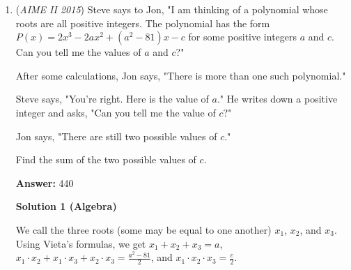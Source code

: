 \begin{enumerate}
Lets start with some simpler cases. For example, lets use a 2x2. We have $2$ horizontally and $2$ vertically, for a total of $4$. Then, our possible outcomes is just $\binom{4}{2}$, so our probability is just $\dfrac{2}{3}$. Now, lets do a 3x3. We have that there are $6$ horizontally and $6$ vertically, for a total of $12$. Our possible outcomes is just $\binom{9}{2} = 36$. Now, our probability is just $\dfrac{1}{3}$. Now, lets try to generalize. For each colum, there is $n-1$ ways, then we multiply that by $n$ for our $n$ columns. Then we multiply all that by $2$ for the rows to get $2n(n-1)$. For our denominator, we have $n^2$ squares, and we need to choose $2$ of them, so our probability is: 
 \[\dfrac{2n(n-1)}{\binom{n^2}{2}}\]. Lets simplify this. We have: 
 \[\dfrac{2n(n-1)}{\dfrac{n^2(n^2-1)}{2}} \Longrightarrow \dfrac{4}{n(n+1)}\]. So, we have this to be less than $\dfrac{1}{2015}$. So we have: 
 \[\dfrac{4}{n(n+1)} < \dfrac{1}{2015} \Longrightarrow n(n+1) > 8060\], so the smallest $n$ that satisfies this condition is $n = \boxed{090}$

 -jb2015007

 


 


	\item (\textit{AIME II 2015}) Steve says to Jon, "I am thinking of a polynomial whose roots are all positive integers. The polynomial has the form $P(x) = 2x^3-2ax^2+(a^2-81)x-c$ for some positive integers $a$ and $c$. Can you tell me the values of $a$ and $c$?"


 After some calculations, Jon says, "There is more than one such polynomial."


 Steve says, "You're right.  Here is the value of $a$." He writes down a positive integer and asks, "Can you tell me the value of $c$?"


 Jon says, "There are still two possible values of $c$."


 Find the sum of the two possible values of $c$.


 
 \textbf{Answer: }440



\textbf{Solution 1 (Algebra)}

We call the three roots (some may be equal to one another) $x_1$, $x_2$, and $x_3$.  Using Vieta's formulas, we get $x_1+x_2+x_3 = a$, $x_1 \cdot x_2+x_1 \cdot x_3+x_2 \cdot x_3 = \frac{a^2-81}{2}$, and $x_1 \cdot x_2 \cdot x_3 = \frac{c}{2}$. 


\end{enumerate}
